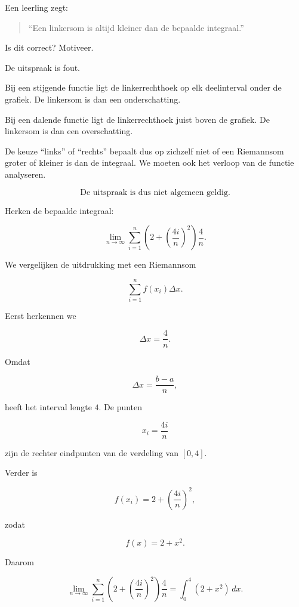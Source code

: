 \documentclass{ximera}
\begin{document}

\begin{oefening}{\oefU\ESS}

Een leerling zegt:

\begin{quote}
``Een linkersom is altijd kleiner dan de bepaalde integraal.''
\end{quote}

Is dit correct? Motiveer.

\begin{oplossing}
De uitspraak is fout.

Bij een stijgende functie ligt de linkerrechthoek op elk deelinterval
onder de grafiek. De linkersom is dan een onderschatting.

Bij een dalende functie ligt de linkerrechthoek juist boven de grafiek.
De linkersom is dan een overschatting.

De keuze ``links'' of ``rechts'' bepaalt dus op zichzelf niet of een
Riemannsom groter of kleiner is dan de integraal. We moeten ook het
verloop van de functie analyseren.

\[
\boxed{\text{De uitspraak is dus niet algemeen geldig.}}
\]
\end{oplossing}

\end{oefening}



\begin{oefening}{\oefU\ESS}

Herken de bepaalde integraal:

\[
\lim_{n\to\infty}
\sum_{i=1}^{n}
\left(2+\left(\frac{4i}{n}\right)^2\right)
\frac{4}{n}.
\]

\begin{oplossing}
We vergelijken de uitdrukking met een Riemannsom

\[
\sum_{i=1}^n f(x_i)\Delta x.
\]

Eerst herkennen we

\[
\Delta x=\frac4n.
\]

Omdat

\[
\Delta x=\frac{b-a}{n},
\]

heeft het interval lengte \(4\). De punten

\[
x_i=\frac{4i}{n}
\]

zijn de rechter eindpunten van de verdeling van \([0,4]\).

Verder is

\[
f(x_i)=2+\left(\frac{4i}{n}\right)^2,
\]

zodat

\[
f(x)=2+x^2.
\]

Daarom

\[
\boxed{
\lim_{n\to\infty}
\sum_{i=1}^{n}
\left(2+\left(\frac{4i}{n}\right)^2\right)
\frac{4}{n}
=
\int_0^4(2+x^2)\,dx
}.
\]
\end{oplossing}

\end{oefening}
\end{document}
